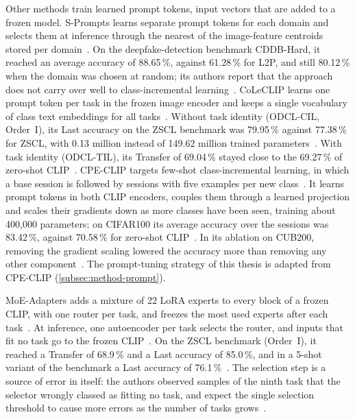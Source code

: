 Other methods train learned prompt tokens, input vectors that are added to a frozen model.
S-Prompts learns separate prompt tokens for each domain and selects them at inference through the nearest of the image-feature centroids stored per domain~\cite{wang2023spromptslearningpretrainedtransformers}.
On the deepfake-detection benchmark CDDB-Hard, it reached an average accuracy of 88.65\,\%, against 61.28\,\% for L2P, and still 80.12\,\% when the domain was chosen at random; its authors report that the approach does not carry over well to class-incremental learning~\cite{wang2023spromptslearningpretrainedtransformers}.
CoLeCLIP learns one prompt token per task in the frozen image encoder and keeps a single vocabulary of class text embeddings for all tasks~\cite{li2024coleclipopendomaincontinuallearning}.
Without task identity (ODCL-CIL, Order~I), its Last accuracy on the ZSCL benchmark was 79.95\,\% against 77.38\,\% for ZSCL, with 0.13 million instead of 149.62 million trained parameters~\cite{li2024coleclipopendomaincontinuallearning}.
With task identity (ODCL-TIL), its Transfer of 69.04\,\% stayed close to the 69.27\,\% of zero-shot CLIP~\cite{li2024coleclipopendomaincontinuallearning}.
CPE-CLIP targets few-shot class-incremental learning, in which a base session is followed by sessions with five examples per new class~\cite{D_Alessandro_2023}.
It learns prompt tokens in both CLIP encoders, couples them through a learned projection and scales their gradients down as more classes have been seen, training about 400{,}000 parameters; on CIFAR100 its average accuracy over the sessions was 83.42\,\%, against 70.58\,\% for zero-shot CLIP~\cite{D_Alessandro_2023}.
In its ablation on CUB200, removing the gradient scaling lowered the accuracy more than removing any other component~\cite[Sec.~5.5, Fig.~2]{D_Alessandro_2023}.
The prompt-tuning strategy of this thesis is adapted from CPE-CLIP (\cref{subsec:method-prompt}).

MoE-Adapters adds a mixture of 22 LoRA experts to every block of a frozen CLIP, with one router per task, and freezes the most used experts after each task~\cite{yu2024boostingcontinuallearningvisionlanguage}.
At inference, one autoencoder per task selects the router, and inputs that fit no task go to the frozen CLIP~\cite{yu2024boostingcontinuallearningvisionlanguage}.
On the ZSCL benchmark (Order~I), it reached a Transfer of 68.9\,\% and a Last accuracy of 85.0\,\%, and in a 5-shot variant of the benchmark a Last accuracy of 76.1\,\%~\cite{yu2024boostingcontinuallearningvisionlanguage}.
The selection step is a source of error in itself: the authors observed samples of the ninth task that the selector wrongly classed as fitting no task, and expect the single selection threshold to cause more errors as the number of tasks grows~\cite{yu2024boostingcontinuallearningvisionlanguage}.


